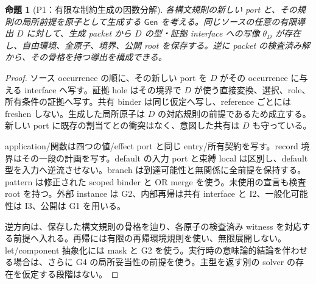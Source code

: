 \documentclass[11pt,a4paper]{article}
\newtheorem{theorem}{命題}[section]
\theoremstyle{remark}
\begin{document}
\begin{theorem}[P1：有限な制約生成の因数分解]
各構文規則の新しい port と、その規則の局所前提を原子として生成する $\mathsf{Gen}$ を考える。同じソースの任意の有限導出 $D$ に対して、生成 packet から $D$ の型・証拠 interface への写像 $\theta_D$ が存在し、自由環境、全原子、境界、公開 root を保存する。逆に packet の検査済み解から、その骨格を持つ導出を構成できる。
\end{theorem}
\begin{proof}
ソース occurrence の順に、その新しい port を $D$ がその occurrence に与える interface へ写す。証拠 hole はその境界で $D$ が使う直接変換、選択、role、所有条件の証拠へ写す。共有 binder は同じ仮定へ写し、reference ごとには freshen しない。生成した局所原子は $D$ の対応規則の前提であるため成立する。新しい port に既存の割当てとの衝突はなく、意図した共有は $D$ も守っている。

application/関数は四つの値/effect port と同じ entry/所有契約を写す。record 境界はその一段の計画を写す。default の入力 port と束縛 local は区別し、default 型を入力へ逆流させない。branch は到達可能性と無関係に全前提を保持する。pattern は修正された scoped binder と OR merge を使う。未使用の宣言も検査 root を持つ。外部 instance は G2、内部再帰は共有 interface と I2、一般化可能性は I3、公開は G1 を用いる。

逆方向は、保存した構文規則の骨格を辿り、各原子の検査済み witness を対応する前提へ入れる。再帰には有限の再帰環境規則を使い、無限展開しない。let/component 抽象化には mask と G2 を使う。実行時の意味論的結論を伴わせる場合は、さらに G4 の局所妥当性の前提を使う。主型を返す別の solver の存在を仮定する段階はない。
\end{proof}
\end{document}
